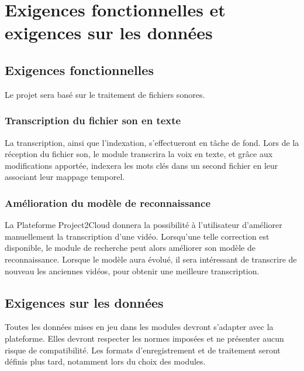 			

			

			

		\section{Exigences fonctionnelles et exigences sur les données}

			\subsection{Exigences fonctionnelles}
			Le projet sera basé sur le traitement de fichiers sonores. 
				\subsubsection*{Transcription du fichier son en texte}
				La transcription, ainsi que l'indexation, s'effectueront en tâche de fond. Lors de la réception du fichier son, le module transcrira la voix en texte, et grâce aux modifications apportée, indexera les mots clés dans un second fichier en leur associant leur mappage temporel.
					
				\subsubsection*{Amélioration du modèle de reconnaissance}
				La Plateforme Project2Cloud donnera la possibilité à l'utilisateur d'améliorer manuellement la transcription d'une vidéo. Lorsqu'une telle correction est disponible, le module de recherche peut alors améliorer son modèle de reconnaissance. Lorsque le modèle aura évolué, il sera intéressant de transcrire de nouveau les anciennes vidéos, pour obtenir une meilleure transcription.
				
					
			\subsection{Exigences sur les données}
			Toutes les données mises en jeu dans les modules devront s'adapter avec la plateforme. Elles devront respecter les normes imposées et ne présenter aucun risque de compatibilité. Les formats d'enregistrement et de traitement seront définis plus tard, notamment lors du choix des modules. 
			
